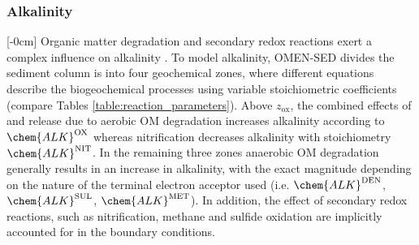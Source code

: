 \documentclass[gmd, manuscript]{copernicus}
\begin{document}
\subsubsection{Alkalinity}\label{subsubsec:ALK}
[-0cm]%
Organic matter degradation and secondary redox reactions exert a complex influence on alkalinity  \citep{wolf-gladrow_total_2007}. To model alkalinity, OMEN-SED divides the sediment column is into four geochemical zones, 
where different equations describe the biogeochemical processes using variable stoichiometric coefficients (compare Tables \ref{table:reaction_parameters}). 
Above $z_{\mathrm{ox}}$, the combined effects of  and  release due to aerobic OM degradation increases alkalinity according to $\chem{ALK}^\mathrm{OX}$ whereas nitrification decreases alkalinity with stoichiometry 
$\chem{ALK}^\mathrm{NIT}$. 
In the remaining three zones anaerobic OM degradation generally results in an increase in alkalinity, with the exact magnitude depending on the nature of the terminal electron acceptor used 
(i.e. $\chem{ALK}^\mathrm{DEN}$, $\chem{ALK}^\mathrm{SUL}$, $\chem{ALK}^\mathrm{MET}$). In addition, the effect of secondary redox reactions, such as nitrification, methane and sulfide oxidation are implicitly accounted for in the 
boundary conditions. 
\end{document}
